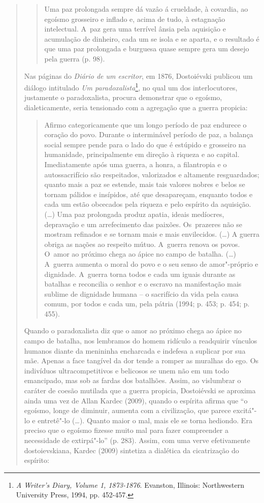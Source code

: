 {\begin{quote}
\begin{quote}
Uma paz prolongada sempre dá vazâo á crueldade, à covardia, ao egoísmo
grosseiro e inflado e, acima de tudo, à estagnação intelectual. A~paz
gera uma terrível ânsia pela aquisição e acumulação de dinheiro, cada um
se isola e se aparta, e o resultado é que uma paz prolongada e burguesa
quase sempre gera um desejo pela guerra (p. 98).
\end{quote}

Nas páginas do \emph{Diário de um escritor}, em 1876, Dostoiévski
publicou um diálogo intitulado \emph{Um paradoxalista}\footnote{\emph{A
  Writer's Diary, Volume 1, 1873-1876}. Evanston, Illinois: Northwestern
  University Press, 1994, pp. 452-457.}, no qual um dos interlocutores,
justamente o paradoxalista, procura demonstrar que o egoísmo,
dialeticamente, seria tensionado com a agregação que a guerra propicia:

\begin{quote}
Afirmo categoricamente que um longo período de paz endurece o coração do
povo. Durante o interminável período de paz, a balança social sempre
pende para o lado do que é estúpido e grosseiro na humanidade,
principalmente em direção à riqueza e ao capital. Imediatamente após uma
guerra, a honra, a filantropia e o autossacrifício são respeitados,
valorizados e altamente resguardados; quanto mais a paz se estende, mais
tais valores nobres e belos se tornam pálidos e insípidos, até que
desapareçam, enquanto todos e cada um estão obcecados pela riqueza e
pelo espírito da aquisição. (\ldots{}) Uma paz prolongada produz apatia,
ideais medíocres, depravação e um arrefecimento das paixões. Os~prazeres
não se mostram refinados e se tornam mais e mais envilecidos. (\ldots{})
A guerra obriga as nações ao respeito mútuo. A~guerra renova os povos. O~amor
ao próximo chega ao ápice no campo de batalha. (\ldots{}) A~guerra
aumenta o moral do povo e o seu senso de amor"-próprio e dignidade. A~guerra
torna todos e cada um iguais durante as batalhas e reconcilia o
senhor e o escravo na manifestação mais sublime de dignidade humana -- o
sacrifício da vida pela causa comum, por todos e cada um, pela pátria
(1994; p. 453; p. 454; p. 455).
\end{quote}

Quando o paradoxalista diz que o amor ao próximo chega ao ápice no campo
de batalha, nos lembramos do homem ridículo a readquirir vínculos
humanos diante da menininha encharcada e indefesa a suplicar por sua
mãe. Apenas a face tangível da dor tende a romper as muralhas do ego. Os
indivíduos ultracompetitivos e belicosos se unem não em um todo
emancipado, mas sob as fardas dos batalhões. Assim, ao vislumbrar o
caráter de coesão mutilada que a guerra propicia, Dostoiévski se
aproxima ainda uma vez de Allan Kardec (2009), quando o espírita afirma
que ``o egoísmo, longe de diminuir, aumenta com a civilização, que
parece excitá"-lo e entretê"-lo (\ldots{}). Quanto maior o mal, mais ele
se torna hediondo. Era preciso que o egoísmo fizesse muito mal para
fazer compreender a necessidade de extirpá"-lo'' (p. 283). Assim, com uma
verve efetivamente dostoievskiana, Kardec (2009) sintetiza a dialética
da cicatrização do espírito:


\end{quote}}
